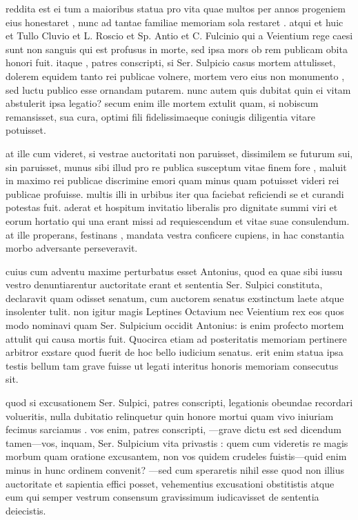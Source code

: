  reddita est ei tum a maioribus statua pro vita quae multos per annos progeniem eius honestaret , nunc ad tantae familiae memoriam sola restaret . atqui et huic et Tullo Cluvio et L. Roscio et Sp. Antio et C. Fulcinio qui a Veientium rege caesi sunt non sanguis qui est profusus in morte, sed ipsa mors ob rem publicam obita honori fuit. itaque , patres conscripti, si Ser. Sulpicio casus mortem attulisset, dolerem equidem tanto rei publicae volnere, mortem vero eius non monumento , sed luctu publico esse ornandam putarem. nunc autem quis dubitat quin ei vitam abstulerit ipsa legatio? secum enim ille mortem extulit quam, si nobiscum remansisset, sua cura, optimi fili fidelissimaeque coniugis diligentia vitare potuisset.

 at ille cum videret, si vestrae auctoritati non paruisset, dissimilem se futurum sui, sin paruisset, munus sibi illud pro re publica susceptum vitae finem fore , maluit in maximo rei publicae discrimine emori quam minus quam potuisset videri rei publicae profuisse. multis illi in urbibus iter qua faciebat reficiendi se et curandi potestas fuit. aderat et hospitum invitatio liberalis pro dignitate summi viri et eorum hortatio qui una erant missi ad requiescendum et vitae suae consulendum. at ille properans, festinans , mandata vestra conficere cupiens, in hac constantia morbo adversante perseveravit.

 cuius cum adventu maxime perturbatus esset Antonius, quod ea quae sibi iussu vestro denuntiarentur auctoritate erant et sententia Ser. Sulpici constituta, declaravit quam odisset senatum, cum auctorem senatus exstinctum laete atque insolenter tulit. non igitur magis Leptines Octavium nec Veientium rex eos quos modo nominavi quam Ser. Sulpicium occidit Antonius: is enim profecto mortem attulit qui causa mortis fuit. Quocirca etiam ad posteritatis memoriam pertinere arbitror exstare quod fuerit de hoc bello iudicium senatus. erit enim statua ipsa testis bellum tam grave fuisse ut legati interitus honoris memoriam consecutus sit.

 quod si excusationem Ser. Sulpici, patres conscripti, legationis obeundae recordari volueritis, nulla dubitatio relinquetur quin honore mortui quam vivo iniuriam fecimus sarciamus . vos enim, patres conscripti, —grave dictu est sed dicendum tamen—vos, inquam, Ser. Sulpicium vita privastis : quem cum videretis re magis morbum quam oratione excusantem, non vos quidem crudeles fuistis—quid enim minus in hunc ordinem convenit? —sed cum speraretis nihil esse quod non illius auctoritate et sapientia effici posset, vehementius excusationi obstitistis atque eum qui semper vestrum consensum gravissimum iudicavisset de sententia deiecistis.

